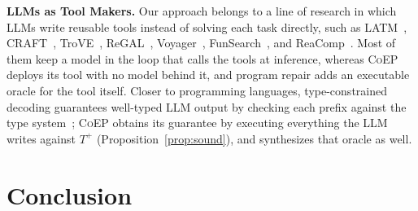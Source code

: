 \documentclass[acmsmall,screen,review,anonymous,nonacm]{acmart}
\newcommand{\tool}{\textsc{CoEP}\xspace}
\begin{document}
\textbf{LLMs as Tool Makers.} Our approach belongs to a line of research in which LLMs write reusable tools instead of solving each task directly, such as LATM~\cite{cai2024large}, CRAFT~\cite{yuan2024craft}, TroVE~\cite{wang2024trove}, ReGAL~\cite{stengel2024regal}, Voyager~\cite{wang2023voyager}, FunSearch~\cite{romera2024mathematical}, and ReaComp~\cite{naik2026reacomp}. Most of them keep a model in the loop that calls the tools at inference, whereas \tool deploys its tool with no model behind it, and program repair adds an executable oracle for the tool itself. Closer to programming languages, type-constrained decoding guarantees well-typed LLM output by checking each prefix against the type system~\cite{mundler2025type}; \tool obtains its guarantee by executing everything the LLM writes against $T^{+}$ (Proposition~\ref{prop:sound}), and synthesizes that oracle as well.


\section{Conclusion}
\end{document}
